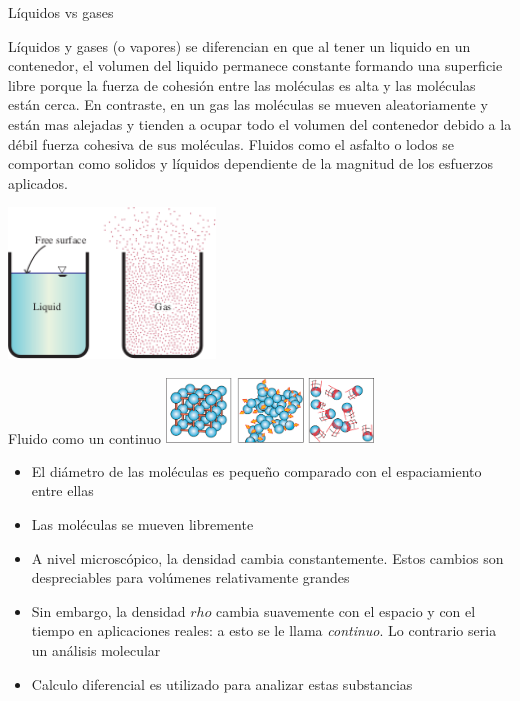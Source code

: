 \documentclass [xcolor=svgnames, t] {beamer}
\begin{document}


\begin{frame}{Líquidos vs gases}
\vspace{-0.5cm}
\begin{exampleblock}{}
Líquidos y gases (o vapores) se diferencian en que al tener un liquido en un contenedor, el volumen del liquido permanece constante formando una superficie libre porque la fuerza de cohesión entre las moléculas es alta y las moléculas están cerca. En contraste, en un gas las moléculas se mueven aleatoriamente y están mas alejadas y tienden a ocupar todo el volumen del contenedor debido a la débil fuerza cohesiva de sus moléculas. Fluidos como el asfalto o lodos se comportan como solidos y líquidos dependiente de la magnitud de los esfuerzos aplicados. 
\end{exampleblock}
\centering
\includegraphics[width=5.5cm]{liqGas}
\end{frame}


\begin{frame}{Fluido como un continuo}
\centering
\includegraphics[width=5.5cm]{conti}
\begin{exampleblock}{}
\begin{itemize}
\item El diámetro de las moléculas es pequeño comparado con el espaciamiento entre ellas
\item Las moléculas se mueven libremente
\item A nivel microscópico, la densidad cambia constantemente. Estos cambios son despreciables para volúmenes relativamente grandes 
\item Sin embargo, la densidad $rho$ cambia suavemente con el espacio y con el tiempo en aplicaciones reales: a esto se le llama \emph{continuo}. Lo contrario seria un análisis molecular
\item Calculo diferencial es utilizado para analizar estas substancias
\end{itemize}
\end{exampleblock}
\end{frame}
\end{document}

